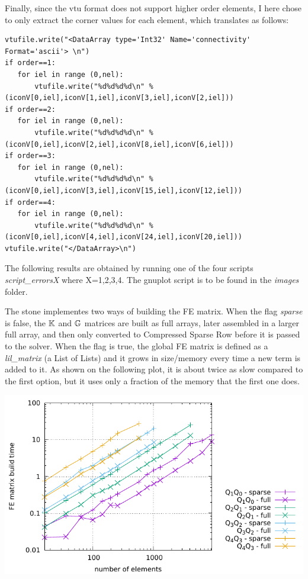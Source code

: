 Finally, since the vtu format does not support higher order elements, I 
here chose to only extract the corner values for each element, 
which translates as follows:
\begin{lstlisting}
vtufile.write("<DataArray type='Int32' Name='connectivity' Format='ascii'> \n")
if order==1:
   for iel in range (0,nel):
       vtufile.write("%d%d%d%d\n" %(iconV[0,iel],iconV[1,iel],iconV[3,iel],iconV[2,iel]))
if order==2:
   for iel in range (0,nel):
       vtufile.write("%d%d%d%d\n" %(iconV[0,iel],iconV[2,iel],iconV[8,iel],iconV[6,iel]))
if order==3:
   for iel in range (0,nel):
       vtufile.write("%d%d%d%d\n" %(iconV[0,iel],iconV[3,iel],iconV[15,iel],iconV[12,iel]))
if order==4:
   for iel in range (0,nel):
       vtufile.write("%d%d%d%d\n" %(iconV[0,iel],iconV[4,iel],iconV[24,iel],iconV[20,iel]))
vtufile.write("</DataArray>\n")
\end{lstlisting}


The following results are obtained by running one of the four scripts {\sl script\_errorsX} 
where X=1,2,3,4. The gnuplot script is to be found in the {\sl images} folder.

The stone implementes two ways of building the FE matrix. When the flag {\sl sparse} 
is false, the ${\mathbb{K}}$ and ${\mathbb{G}}$ matrices are built as full arrays, later assembled in a
larger full array, and then only converted to Compressed Sparse Row  before 
it is passed to the solver. When the flag is true, the global FE matrix 
is defined as a {\sl lil\_matrix} (a List of Lists) and it grows in size/memory
every time a new term is added to it. As shown on the following plot, it is about 
twice as slow compared to the first option, but it uses only a fraction of the memory
that the first one does. 

\begin{center}
\includegraphics[height=6.cm]{python_codes/fieldstone_48/images/FEMbuildtimes.pdf}
\end{center}

